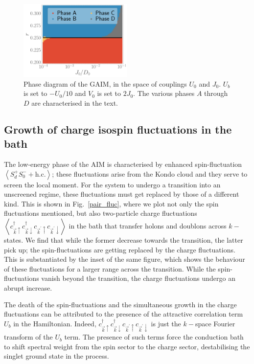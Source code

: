 \documentclass[reprint,superscriptaddress,floatfix]{revtex4-2}
\begin{document}
\begin{figure}[!htb]
	\includegraphics[width=0.5\textwidth]{phase-map-MIT.pdf}
	\caption{Phase diagram of the GAIM, in the space of couplings \(U_0\) and \(J_0\). \(U_b\) is set to \(-U_0/10\) and \(V_0\) is set to \(2J_0\). The various phases \(A\) through \(D\) are characterised in the text.}
	\label{phase-diag}
\end{figure}

\subsection{Growth of charge isospin fluctuations in the bath}
The low-energy phase of the AIM is characterised by enhanced spin-fluctuation \(\left<S_d^+S_0^- + \text{h.c.}\right>\); these fluctuations arise from the Kondo cloud and they serve to screen the local moment. For the system to undergo a transition into an unscreened regime, these fluctuations must get replaced by those of a different kind. This is shown in Fig.~\ref{pair_fluc}, where we plot not only the spin fluctuations mentioned, but also two-particle charge fluctuations \(\left<c^\dagger_{\vec k \uparrow} c^\dagger_{\vec k \downarrow} c_{\vec k^\prime \uparrow} c_{\vec k^\prime \downarrow}\right>\) in the bath that transfer holons and doublons across \(k-\)states. We find that while the former decrease towards the transition, the latter pick up; the spin-fluctuations are getting replaced by the charge fluctuations. This is substantiated by the inset of the same figure, which shows the behaviour of these fluctuations for a larger range across the transition. While the spin-fluctuations vanish beyond the transition, the charge fluctuations undergo an abrupt increase.

{\color{blue}The death of the spin-fluctuations and the simultaneous growth in the charge fluctuations can be attributed to the presence of the attractive correlation term \(U_b\) in the Hamiltonian. Indeed, \(c^\dagger_{\vec k \uparrow} c^\dagger_{\vec k \downarrow} c_{\vec k^\prime \uparrow} c_{\vec k^\prime \downarrow}\) is just the \(k-\)space Fourier transform of the \(U_b\) term. The presence of such terms force the conduction bath to shift spectral weight from the spin sector to the charge sector, destabilising the singlet ground state in the process.}
\end{document}
